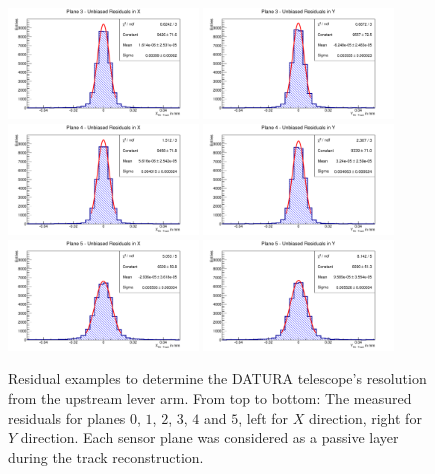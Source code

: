 \begin{figure}[hbtp]
\includegraphics[width=0.45\textwidth]{figures/resis_downstream/3x.pdf}
\includegraphics[width=0.45\textwidth]{figures/resis_downstream/3y.pdf}
\includegraphics[width=0.45\textwidth]{figures/resis_downstream/4x.pdf}
\includegraphics[width=0.45\textwidth]{figures/resis_downstream/4y.pdf}
\includegraphics[width=0.45\textwidth]{figures/resis_downstream/5x.pdf}
\includegraphics[width=0.45\textwidth]{figures/resis_downstream/5y.pdf}
\caption[Residual examples to determine the DATURA telescope's
resolution. Upstream lever arm]{Residual examples to determine the DATURA
telescope's resolution from the upstream lever arm. From top to bottom: The
measured residuals for planes $0$, $1$, $2$, $3$, $4$ and $5$, left for $X$
direction, right for $Y$ direction. Each sensor plane was considered as a
passive layer during the track reconstruction.}
\label{fig:residualexample1}
\end{figure}

